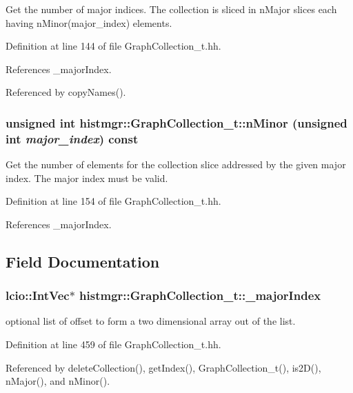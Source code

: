 Get the number of major indices. The collection is sliced in nMajor slices each having nMinor(major\_\-index) elements. 

Definition at line 144 of file GraphCollection\_\-t.hh.

References \_\-majorIndex.

Referenced by copyNames().
\subsubsection[{nMinor}]{\setlength{\rightskip}{0pt plus 5cm}unsigned int histmgr::GraphCollection\_\-t::nMinor (unsigned int {\em major\_\-index}) const\hspace{0.3cm}{\ttfamily  [inline]}}\label{classhistmgr_1_1GraphCollection__t_a3428f5d67d892f34f6c5856638873e52}


Get the number of elements for the collection slice addressed by the given major index. The major index must be valid. 

Definition at line 154 of file GraphCollection\_\-t.hh.

References \_\-majorIndex.

\subsection{Field Documentation}
\subsubsection[{\_\-majorIndex}]{\setlength{\rightskip}{0pt plus 5cm}lcio::IntVec$\ast$ {\bf histmgr::GraphCollection\_\-t::\_\-majorIndex}\hspace{0.3cm}{\ttfamily  [private]}}\label{classhistmgr_1_1GraphCollection__t_aed8f07d8d9e9dc0579ac46468f7102a5}


optional list of offset to form a two dimensional array out of the list. 

Definition at line 459 of file GraphCollection\_\-t.hh.

Referenced by deleteCollection(), getIndex(), GraphCollection\_\-t(), is2D(), nMajor(), and nMinor().
